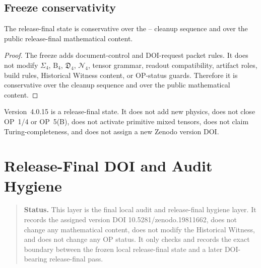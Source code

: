 \subsection{Freeze conservativity}
\label{subsec:v4015-freeze-conservativity}

\begin{theorem}
\label{thm:v4015-local-release-release-final state-freeze-conservativity}
The  release-final state is conservative over the --
cleanup sequence and over the public  release-final mathematical content.
\end{theorem}

\begin{proof}
The freeze adds document-control and DOI-request packet rules. It does not
modify $\Sigma_4$, $\mathrm B_4$, $\mathfrak D_4$, $\mathcal N_4$, tensor
grammar, readout compatibility, artifact roles, build rules, Historical Witness
content, or OP-status guards. Therefore it is conservative over the cleanup
sequence and over the public  mathematical content.
\end{proof}

\begin{remark}
\label{rem:v4015-non-claim}
Version~4.0.15 is a release-final state. It does not add new
physics, does not close OP~1/4 or OP~5(B), does not activate primitive mixed
tensors, does not claim Turing-completeness, and does not assign a new Zenodo
version DOI.
\end{remark}



\clearpage
\section{ Release-Final DOI and Audit Hygiene}
\label{sec:v4016-final-local-audit-release-final-release-final-hygiene}

\begin{quote}\small
\noindent\textbf{Status.}
This  layer is the final local audit and release-final hygiene
layer. It records the assigned version DOI 10.5281/zenodo.19811662, does not change any mathematical content,
does not modify the Historical Witness, and does not change any OP status. It
only checks and records the exact boundary between the frozen local release-final state
and a later DOI-bearing release-final pass.
\end{quote}

